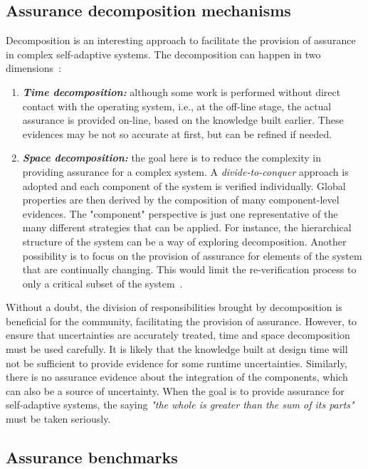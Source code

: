 \subsection{Assurance decomposition mechanisms}

Decomposition is an interesting approach to facilitate the provision of assurance in complex self-adaptive systems. The decomposition can happen in two dimensions~\cite{Weyns2016PerpetualAF}:

\begin{enumerate}
\item \textit{\textbf{Time decomposition:}} although some work is performed without direct contact with the operating system, i.e., at the off-line stage, the actual assurance is provided on-line, based on the knowledge built earlier. These evidences may be not so accurate at first, but can be refined if needed.

\item \textit{\textbf{Space decomposition:}} the goal here is to reduce the complexity in providing assurance for a complex system. A \textit{divide-to-conquer} approach is adopted and each component of the system is verified individually. Global properties are then derived by the composition of many component-level evidences. The "component" perspective is just one representative of the many different strategies that can be applied. For instance, the hierarchical structure of the system can be a way of exploring decomposition. Another possibility is to focus on the provision of assurance for elements of the system that are continually changing. This would limit the re-verification process to only a critical subset of the system~\cite{Weyns2016PerpetualAF}.
\end{enumerate}

Without a doubt, the division of responsibilities brought by decomposition is beneficial for the community, facilitating the provision of assurance. However, to ensure that uncertainties are accurately treated, time and space decomposition must be used carefully. It is likely that the knowledge built at design time will not be sufficient to provide evidence for some runtime uncertainties. Similarly, there is no assurance evidence about the integration of the components, which can also be a source of uncertainty. When the goal is to provide assurance for self-adaptive systems, the saying \textit{"the whole is greater than the sum of its parts"} must be taken seriously.

\subsection{Assurance benchmarks}

